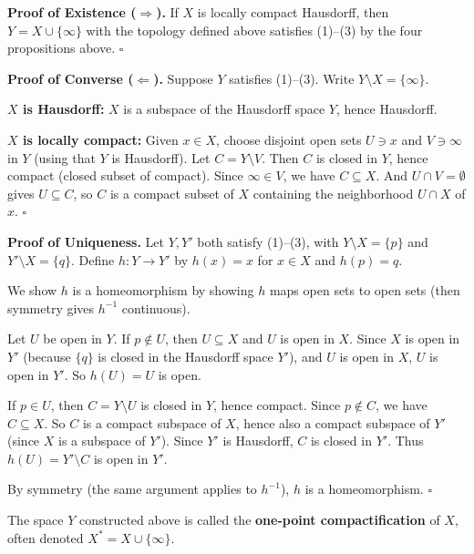 \documentclass[11pt]{report}
\renewenvironment{proof}[1][Proof]{\noindent\textbf{#1.} }{\hfill$\square$\par\vspace{5pt}}
\begin{document}
\begin{proof}[Proof of Existence ($\Rightarrow$)]
If $X$ is locally compact Hausdorff, then $Y = X \cup \{\infty\}$ with the topology defined above satisfies (1)--(3) by the four propositions above.
\end{proof}

\begin{proof}[Proof of Converse ($\Leftarrow$)]
Suppose $Y$ satisfies (1)--(3). Write $Y \setminus X = \{\infty\}$.

\textbf{$X$ is Hausdorff:} $X$ is a subspace of the Hausdorff space $Y$, hence Hausdorff.

\textbf{$X$ is locally compact:} Given $x \in X$, choose disjoint open sets $U \ni x$ and $V \ni \infty$ in $Y$ (using that $Y$ is Hausdorff). Let $C = Y \setminus V$. Then $C$ is closed in $Y$, hence compact (closed subset of compact). Since $\infty \in V$, we have $C \subseteq X$. And $U \cap V = \emptyset$ gives $U \subseteq C$, so $C$ is a compact subset of $X$ containing the neighborhood $U \cap X$ of $x$.
\end{proof}

\begin{proof}[Proof of Uniqueness]
Let $Y, Y'$ both satisfy (1)--(3), with $Y \setminus X = \{p\}$ and $Y' \setminus X = \{q\}$. Define $h: Y \to Y'$ by $h(x) = x$ for $x \in X$ and $h(p) = q$.

We show $h$ is a homeomorphism by showing $h$ maps open sets to open sets (then symmetry gives $h^{-1}$ continuous).

Let $U$ be open in $Y$. If $p \notin U$, then $U \subseteq X$ and $U$ is open in $X$. Since $X$ is open in $Y'$ (because $\{q\}$ is closed in the Hausdorff space $Y'$), and $U$ is open in $X$, $U$ is open in $Y'$. So $h(U) = U$ is open. \checkmark

If $p \in U$, then $C = Y \setminus U$ is closed in $Y$, hence compact. Since $p \notin C$, we have $C \subseteq X$. So $C$ is a compact subspace of $X$, hence also a compact subspace of $Y'$ (since $X$ is a subspace of $Y'$). Since $Y'$ is Hausdorff, $C$ is closed in $Y'$. Thus $h(U) = Y' \setminus C$ is open in $Y'$. \checkmark

By symmetry (the same argument applies to $h^{-1}$), $h$ is a homeomorphism.
\end{proof}

\begin{defbox}
The space $Y$ constructed above is called the \textbf{one-point compactification} of $X$, often denoted $X^* = X \cup \{\infty\}$.
\end{defbox}
\end{document}

